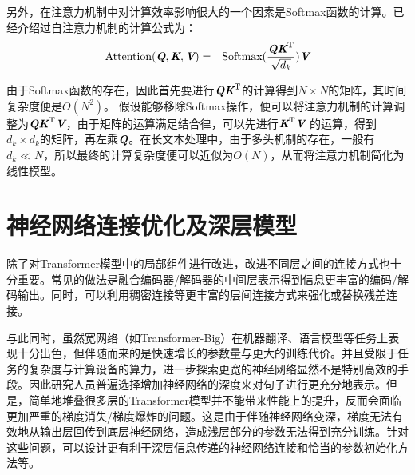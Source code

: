 \parinterval 另外，在注意力机制中对计算效率影响很大的一个因素是Softmax函数的计算。{\chaptertwelve}已经介绍过自注意力机制的计算公式为：
\begin{eqnarray}
\textrm{Attention}(\textbf{\em Q},\textbf{\em K},\textbf{\em V}) &=& \textrm{Softmax}
 ( \frac{\textbf{\em Q}\textbf{\em K}^{\textrm{T}}} {\sqrt{d_k}}) \textbf{\em V}
\label{eq:15-25}
\end{eqnarray}

\parinterval 由于Softmax函数的存在，因此首先要进行$\textbf{\em Q}\textbf{\em K}^{\textrm{T}}$的计算得到$N \times N$的矩阵，其时间复杂度便是$O(N^2)$。 假设能够移除Softmax操作，便可以将注意力机制的计算调整为$\textbf{\em Q}\textbf{\em K}^{\textrm{T}}\textbf{\em V}$，由于矩阵的运算满足结合律，可以先进行$\textbf{\em K}^{\textrm{T}}\textbf{\em V}$ 的运算，得到$d_k \times d_k$的矩阵，再左乘$\textbf{\em Q}$。在长文本处理中，由于多头机制的存在，一般有$d_k \ll N$，所以最终的计算复杂度便可以近似为$O(N)$，从而将注意力机制简化为线性模型。


\sectionnewpage
\section{神经网络连接优化及深层模型}

\parinterval 除了对Transformer模型中的局部组件进行改进，改进不同层之间的连接方式也十分重要。常见的做法是融合编码器/解码器的中间层表示得到信息更丰富的编码/解码输出。同时，可以利用稠密连接等更丰富的层间连接方式来强化或替换残差连接。

\parinterval 与此同时，虽然宽网络（如Transformer-Big）在机器翻译、语言模型等任务上表现十分出色，但伴随而来的是快速增长的参数量与更大的训练代价。并且受限于任务的复杂度与计算设备的算力，进一步探索更宽的神经网络显然不是特别高效的手段。因此研究人员普遍选择增加神经网络的深度来对句子进行更充分地表示。但是，简单地堆叠很多层的Transformer模型并不能带来性能上的提升，反而会面临更加严重的梯度消失/梯度爆炸的问题。这是由于伴随神经网络变深，梯度无法有效地从输出层回传到底层神经网络，造成浅层部分的参数无法得到充分训练。针对这些问题，可以设计更有利于深层信息传递的神经网络连接和恰当的参数初始化方法等。

